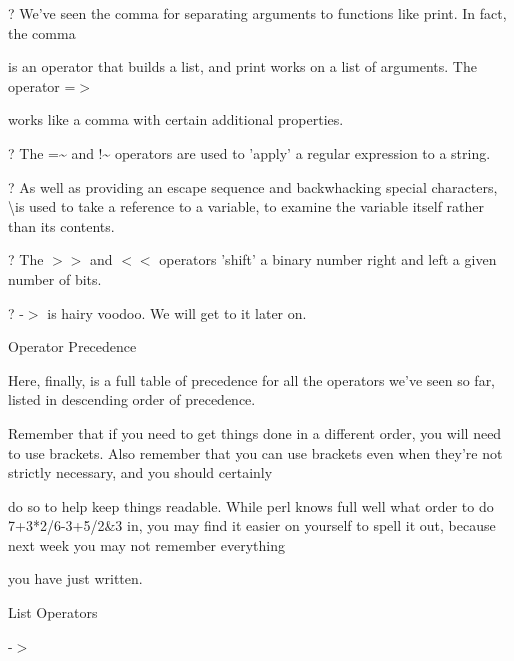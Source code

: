 \documentclass[a4paper,11pt]{book}
\begin{document}
\noindent 

\noindent ? We've seen the comma for separating arguments to functions like print. In fact, the comma

\noindent is an operator that builds a list, and print works on a list of arguments. The operator =$>$

\noindent works like a comma with certain additional properties.

\noindent 

\noindent ? The =\~{} and !\~{} operators are used to 'apply' a regular expression to a string.

\noindent 

\noindent ? As well as providing an escape sequence and backwhacking special characters, \textbackslash  is used to take a reference to a variable, to examine the variable itself rather than its contents.

\noindent 

\noindent ? The $>$$>$ and $<$$<$ operators 'shift' a binary number right and left a given number of bits.

\noindent 

\noindent ? -$>$ is hairy voodoo. We will get to it later on.

\noindent 

\noindent 

\noindent Operator Precedence

\noindent 

\noindent Here, finally, is a full table of precedence for all the operators we've seen so far, listed in descending order of precedence.

\noindent 

\noindent Remember that if you need to get things done in a different order, you will need to use brackets. Also remember that you can use brackets even when they're not strictly necessary, and you should certainly

\noindent do so to help keep things readable. While perl knows full well what order to do 7+3*2/6-3+5/2\&3 in, you may find it easier on yourself to spell it out, because next week you may not remember everything

\noindent you have just written.

\noindent 

\noindent 

\noindent List Operators

\noindent 

\noindent -$>$
\end{document}
